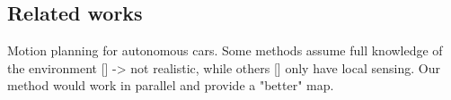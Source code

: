 %
%
%


\subsection{Related works}

Motion planning for autonomous cars. Some methods assume full knowledge of the environment [] -> not realistic, while others [] only have local sensing. Our method would work in parallel and provide a "better" map.

